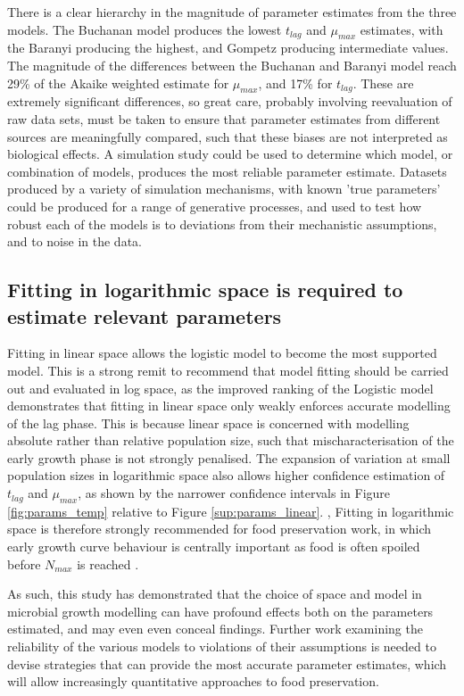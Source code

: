 \documentclass[11pt, a4paper]{article}
\begin{document}
\begin{linenumbers}
There is a clear hierarchy in the magnitude of parameter estimates from the three models. The Buchanan model produces the lowest $t_{lag}$ and $\mu_{max}$ estimates, with the Baranyi producing the highest, and Gompetz producing intermediate values. The magnitude of the differences between the Buchanan and Baranyi model reach 29\% of the Akaike weighted estimate for $\mu_{max}$, and 17\% for $t_{lag}$. These are extremely significant differences, so great care, probably involving reevaluation of raw data sets, must be taken to ensure that parameter estimates from different sources are meaningfully compared, such that these biases are not interpreted as biological effects. A simulation study could be used to determine which model, or combination of models, produces the most reliable parameter estimate. Datasets produced by a variety of simulation mechanisms, with known 'true parameters' could be produced for a range of generative processes, and used to test how robust each of the models is to deviations from their mechanistic assumptions, and to noise in the data.

\subsection{Fitting in logarithmic space is required to estimate relevant parameters}
Fitting in linear space allows the logistic model to become the most supported model. This is a strong remit to recommend that model fitting should be carried out and evaluated in log space, as the improved ranking of the Logistic model demonstrates that fitting in linear space only weakly enforces accurate modelling of the lag phase. This is because linear space is concerned with modelling absolute rather than relative population size, such that mischaracterisation of the early growth phase is not strongly penalised. The expansion of variation at small population sizes in logarithmic space also allows higher confidence estimation of $t_{lag}$ and $\mu_{max}$, as shown by the narrower confidence intervals in Figure \ref{fig:params_temp} relative to Figure \ref{sup:params_linear}. , Fitting in logarithmic space is therefore strongly recommended for food preservation work, in which early growth curve behaviour is centrally important as food is often spoiled before $N_{max}$ is reached \cite{MicrobialGrowth}.

As such, this study has demonstrated that the choice of space and model in microbial growth modelling can have profound effects both on the parameters estimated, and may even even conceal findings. Further work examining the reliability of the various models to violations of their assumptions is needed to devise strategies that can provide the most accurate parameter estimates, which will allow increasingly quantitative approaches to food preservation.




\end{linenumbers}
\end{document}
